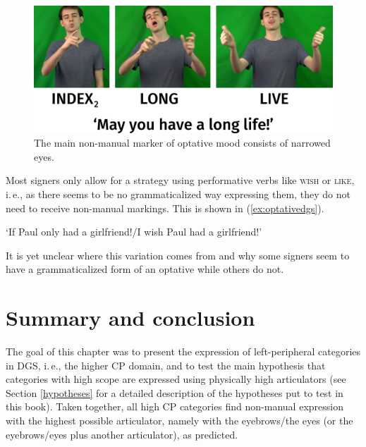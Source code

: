 \begin{figure}[bt]
\centering
	\includegraphics[width=1.0\textwidth]{optative.jpg}
	\caption{The main non-manual marker of optative mood consists of narrowed eyes.}
	\label{optativesnonmanuals}
\end{figure}

Most signers only allow for a strategy using performative verbs like \textsc{wish} or \textsc{like}, i.\,e., as there seems to be no grammaticalized way expressing them, they do not need to receive non-manual markings. This is shown in (\ref{ex:optativedgs}).

\begin{exe}

\glt `If Paul only had a girlfriend!/I wish Paul had a girlfriend!' \label{ex:optativedgs}

\end{exe} 

\noindent It is yet unclear where this variation comes from and why some signers seem to have a grammaticalized form of an optative while others do not.


\section{Summary and conclusion}
The goal of this chapter was to present the expression of left-peripheral categories in DGS, i.\,e., the higher CP domain, and to test the main hypothesis that categories with high scope are expressed using physically high articulators (see Section \ref{hypotheses} for a detailed description of the hypotheses put to test in this book). Taken together, all high CP categories find non-manual expression with the highest possible articulator, namely with the eyebrows/the eyes (or the eyebrows/eyes plus another articulator), as predicted. 

